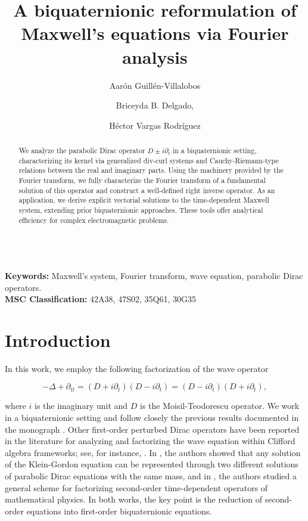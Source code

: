 \documentclass[12pt]{article}
\begin{document}
 
\title{A biquaternionic reformulation of Maxwell's equations via Fourier analysis}
\makeatletter
\author{Aarón Guillén-Villalobos \and Briceyda B. Delgado, \and Héctor Vargas Rodríguez}

\date{}
\maketitle
\begin{abstract}
    We analyze the parabolic Dirac operator $D \pm i\partial_t$ in a biquaternionic setting, characterizing its kernel via generalized div-curl systems and Cauchy-Riemann-type relations between the real and imaginary parts. Using the machinery provided by the Fourier transform, we fully characterize the Fourier transform of a fundamental solution of this operator and construct a well-defined right inverse operator. As an application, we derive explicit vectorial solutions to the time-dependent Maxwell system, extending prior biquaternionic approaches. These tools offer analytical efficiency for complex electromagnetic problems.

\end{abstract}
\mbox{}\\
\noindent \textbf{Keywords:} Maxwell's system, Fourier transform, wave equation, parabolic Dirac\\ operators.
\mbox{}\\
\noindent \textbf{MSC Classification:} 42A38, 47S02, 35Q61, 30G35



\section{Introduction}
In this work, we employ the following factorization of the wave operator 

\begin{equation*}
    -\Delta+\partial_{tt}=(D+i\partial_t)(D-i\partial_t)=(D-i\partial_t)(D+i\partial_t),
\end{equation*}

where $i$ is the imaginary unit and $D$ is the Moisil-Teodorescu operator. We work in a biquaternionic setting and follow closely the previous results documented in the monograph \cite{kravchenko2003applied}. Other first-order perturbed Dirac operators have been reported in the literature for analyzing and factorizing the wave equation within Clifford algebra frameworks; see, for instance, \cite{eelbode2003solutions, eelbode2004inverse, eelbode2005fundamental, marmolejo2023basic}. In \cite{kravchenko1998kernel}, the authors showed that any solution of the Klein-Gordon equation can be represented through two different solutions of parabolic Dirac equations with the same mass, and in \cite{cerejeiras2008factorization}, the authors studied a general scheme for factorizing second-order time-dependent operators of mathematical physics. In both works, the key point is the reduction of second-order equations into first-order biquaternionic equations.
\end{document}
